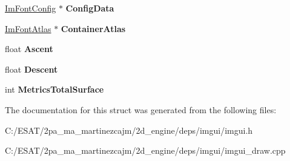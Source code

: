 \begin{DoxyCompactItemize}
\item 
\mbox{\label{struct_im_font_afa4eb6cfb979ffa120e9795f328623a1}} 
\hyperlink{struct_im_font_config}{Im\+Font\+Config} $\ast$ {\bfseries Config\+Data}
\item 
\mbox{\label{struct_im_font_a8a5e0df6be5e3cabe91ae830524db960}} 
\hyperlink{struct_im_font_atlas}{Im\+Font\+Atlas} $\ast$ {\bfseries Container\+Atlas}
\item 
\mbox{\label{struct_im_font_a5238ef18f8ad02b783fb8b3a195b708e}} 
float {\bfseries Ascent}
\item 
\mbox{\label{struct_im_font_abcca12aa908bf7105433e7db6088a5e5}} 
float {\bfseries Descent}
\item 
\mbox{\label{struct_im_font_a8087b2ee8b27dcf5c6e30a8318f87cc7}} 
int {\bfseries Metrics\+Total\+Surface}
\end{DoxyCompactItemize}


The documentation for this struct was generated from the following files\+:\begin{DoxyCompactItemize}
\item 
C\+:/\+E\+S\+A\+T/2pa\+\_\+ma\+\_\+martinezcajm/2d\+\_\+engine/deps/imgui/imgui.\+h\item 
C\+:/\+E\+S\+A\+T/2pa\+\_\+ma\+\_\+martinezcajm/2d\+\_\+engine/deps/imgui/imgui\+\_\+draw.\+cpp\end{DoxyCompactItemize}
